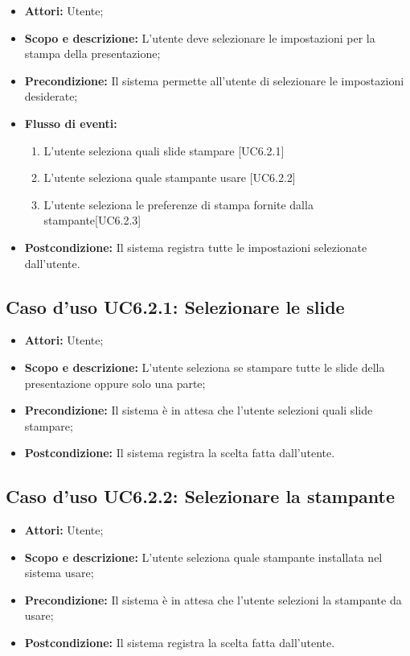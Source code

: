 \begin{itemize}
	\item \textbf{Attori:} Utente;
	\item \textbf{Scopo e descrizione:} L'utente deve selezionare le impostazioni per la stampa della presentazione;
	\item \textbf{Precondizione:} Il sistema permette all'utente di selezionare le impostazioni desiderate;
	\item \textbf{Flusso di eventi:}
	\begin{enumerate}
		\item L'utente seleziona quali slide stampare [UC6.2.1]
		\item L'utente seleziona quale stampante usare [UC6.2.2]
		\item L'utente seleziona le preferenze di stampa fornite dalla stampante[UC6.2.3]
	\end{enumerate}
	\item \textbf{Postcondizione:} Il sistema registra tutte le impostazioni selezionate dall'utente.
\end{itemize}

	\subsection{Caso d'uso UC6.2.1: Selezionare le slide}
	\begin{itemize}
		\item \textbf{Attori:} Utente;
		\item \textbf{Scopo e descrizione:} L'utente seleziona se stampare tutte le slide della presentazione oppure solo una parte;
		\item \textbf{Precondizione:} Il sistema è in attesa che l'utente selezioni quali slide stampare;
		\item \textbf{Postcondizione:} Il sistema registra la scelta fatta dall'utente.
	\end{itemize}
	
	\subsection{Caso d'uso UC6.2.2: Selezionare la stampante}
	\begin{itemize}
		\item \textbf{Attori:} Utente;
		\item \textbf{Scopo e descrizione:} L'utente seleziona quale stampante installata nel sistema usare;
		\item \textbf{Precondizione:} Il sistema è in attesa che l'utente selezioni la stampante da usare;
		\item \textbf{Postcondizione:} Il sistema registra la scelta fatta dall'utente.
	\end{itemize}
	
